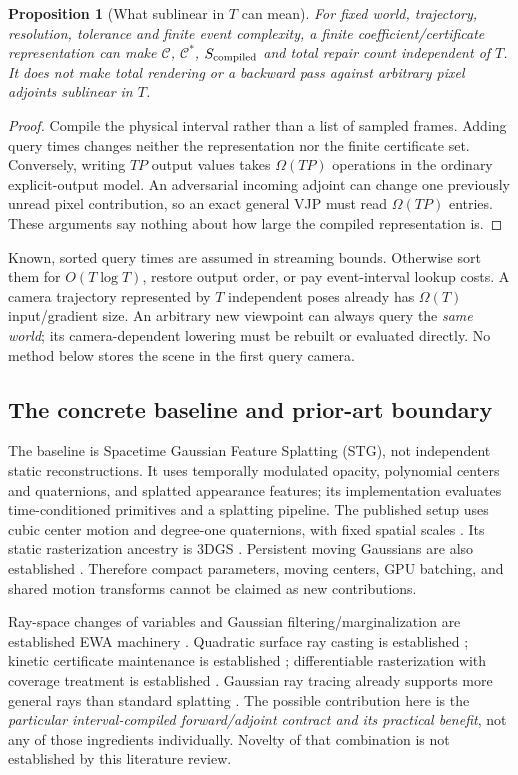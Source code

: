 \documentclass[10pt,letterpaper]{article}
\newtheorem{proposition}{Proposition}
\theoremstyle{remark}\newtheorem{counterexample}[proposition]{Counterexample}
\newcommand{\cost}{\mathcal C}
\begin{document}
\begin{proposition}[What sublinear in $T$ can mean]
For fixed world, trajectory, resolution, tolerance and finite event complexity, a finite coefficient/certificate representation can make $\cost$, $\cost^*$, $S_{\rm compiled}$ and total repair count independent of $T$. It does not make total rendering or a backward pass against arbitrary pixel adjoints sublinear in $T$.
\end{proposition}
\begin{proof}
Compile the physical interval rather than a list of sampled frames. Adding query times changes neither the representation nor the finite certificate set. Conversely, writing $TP$ output values takes $\Omega(TP)$ operations in the ordinary explicit-output model. An adversarial incoming adjoint can change one previously unread pixel contribution, so an exact general VJP must read $\Omega(TP)$ entries. These arguments say nothing about how large the compiled representation is.
\end{proof}

Known, sorted query times are assumed in streaming bounds. Otherwise sort them for $O(T\log T)$, restore output order, or pay event-interval lookup costs. A camera trajectory represented by $T$ independent poses already has $\Omega(T)$ input/gradient size. An arbitrary new viewpoint can always query the \emph{same world}; its camera-dependent lowering must be rebuilt or evaluated directly. No method below stores the scene in the first query camera.

\subsection{The concrete baseline and prior-art boundary}
The baseline is Spacetime Gaussian Feature Splatting (STG), not independent static reconstructions. It uses temporally modulated opacity, polynomial centers and quaternions, and splatted appearance features; its implementation evaluates time-conditioned primitives and a splatting pipeline. The published setup uses cubic center motion and degree-one quaternions, with fixed spatial scales \cite{stg}. Its static rasterization ancestry is 3DGS \cite{3dgs}. Persistent moving Gaussians are also established \cite{dynamic}. Therefore compact parameters, moving centers, GPU batching, and shared motion transforms cannot be claimed as new contributions.

Ray-space changes of variables and Gaussian filtering/marginalization are established EWA machinery \cite{ewa}. Quadratic surface ray casting is established \cite{quadrics}; kinetic certificate maintenance is established \cite{kds}; differentiable rasterization with coverage treatment is established \cite{nvdiffrast,edges,reparam}. Gaussian ray tracing already supports more general rays than standard splatting \cite{3dgrt}. The possible contribution here is the \emph{particular interval-compiled forward/adjoint contract and its practical benefit}, not any of those ingredients individually. Novelty of that combination is not established by this literature review.
\end{document}
